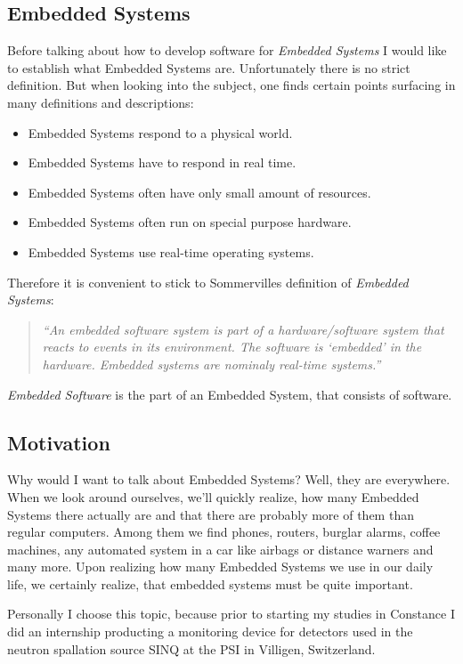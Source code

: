 \documentclass[10pt,a4paper,titlepage,draft]{article} %
\begin{document}
\subsection{Embedded Systems}
Before talking about how to develop software for \emph{Embedded Systems} I would like to establish what Embedded Systems are.
Unfortunately there is no strict definition.
But when looking into the subject, one finds certain points surfacing in many definitions and descriptions:
\begin{itemize}
	\item Embedded Systems respond to a physical world.
	\item Embedded Systems have to respond in real time.
	\item Embedded Systems often have only small amount of resources.
	\item Embedded Systems often run on special purpose hardware.
	\item Embedded Systems use real-time operating systems.
\end{itemize}
Therefore it is convenient to stick to Sommervilles definition of \emph{Embedded Systems}:
\\
\begin{quote}
\textit{``An \emph{embedded software system} is part of a hardware/software system that reacts to events in its environment.
The software is ‘embedded’ in the hardware.
Embedded systems are nominaly real-time systems.'' \cite[p. 561]{sommerville} }
\end{quote}

\emph{Embedded Software} is the part of an Embedded System, that consists of software.

\subsection{Motivation}
Why would I want to talk about Embedded Systems?
Well, they are everywhere. When we look around ourselves, we'll quickly realize, how many Embedded Systems there actually are and that there are probably more of them than regular computers.
Among them we find phones, routers, burglar alarms, coffee machines, any automated system in a car like airbags or distance warners and many more.
Upon realizing how many Embedded Systems we use in our daily life, we certainly realize, that embedded systems must be quite important.

Personally I choose this topic, because prior to starting my studies in Constance I did an internship producting a monitoring device for detectors used in the neutron spallation source SINQ at the PSI in Villigen, Switzerland.
\end{document}
